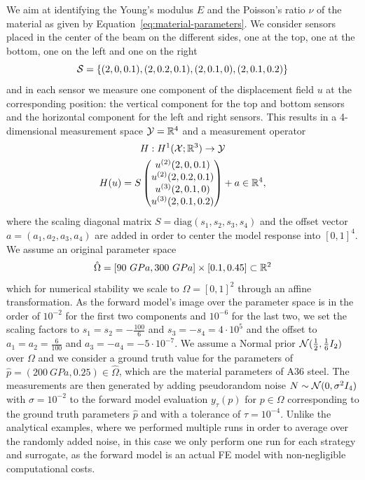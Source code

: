 We aim at identifying the Young's modulus $E$ and the Poisson's ratio $\nu$ of the material as given by Equation~\eqref{eq:material-parameters}.
We consider sensors placed in the center of the beam on the different sides, one at the top, one at the bottom, one on the left and one on the right
\[
    \mathcal S = \left\{ (2,0,0.1), (2,0.2,0.1), (2,0.1,0), (2,0.1,0.2) \right\} 
\]
and in each sensor we measure one component of the displacement field $u$ at the corresponding position: the vertical component for the top and bottom sensors and the horizontal component for the left and right sensors.
This results in a 4-dimensional measurement space $\mathcal Y = \mathbb{R}^4$ and a measurement operator \[
 \begin{gathered}
    H : H^1(\mathcal X;\mathbb{R}^3) \to \mathcal Y \\
    H(u) = S \begin{pmatrix}
     u^{(2)}(2,0,0.1)\\
     u^{(2)}(2,0.2,0.1)\\
     u^{(3)}(2,0.1,0)\\
     u^{(3)}(2,0.1,0.2) 
    \end{pmatrix} + a \in \mathbb{R}^4,
 \end{gathered}
\]
where the scaling diagonal matrix $S = \text{diag}(s_1, s_2, s_3, s_4)$ and the offset vector $a = (a_1,a_2,a_3,a_4)$ are added in order to center the model response into $[0,1]^4$.
We assume an original parameter space 
\[
    \hat \Omega = [90 \ GPa, 300 \ GPa] \times [0.1, 0.45] \subset \mathbb{R}^2 
\]
which for numerical stability we scale to $\Omega = [0,1]^2$ through an affine transformation.
As the forward model's image over the parameter space is in the order of $10^{-2}$ for the first two components and $10^{-6}$ for the last two, we set the scaling factors to $s_1 = s_2 = - \frac{100}{6}$ and $s_3 = - s_4 = 4 \cdot 10^5$ and the offset to $a_1 = a_2 = \frac{6}{100}$ and $a_3 = - a_4 = - 5 \cdot 10^{-7}$. \newline
We assume a Normal prior $\mathcal N(\frac{1}{2}, \frac{1}{6}I_2)$ over $\Omega$ and we consider a ground truth value for the parameters of $\hat p = (200 \ GPa, 0.25) \in \hat \Omega$, which are the material parameters of A36 steel.
The measurements are then generated by adding pseudorandom noise $N \sim \mathcal N (0, \sigma^2 I_4)$ with $\sigma = 10^{-2}$ to the forward model evaluation $y_\tau (p)$ for $p\in \Omega$ corresponding to the ground truth parameters $\hat p$ and with a tolerance of $\tau = 10^{-4}$.
Unlike the analytical examples, where we performed multiple runs in order to average over the randomly added noise, in this case we only perform one run for each strategy and surrogate, as the forward model is an actual FE model with non-negligible computational costs. \medskip

